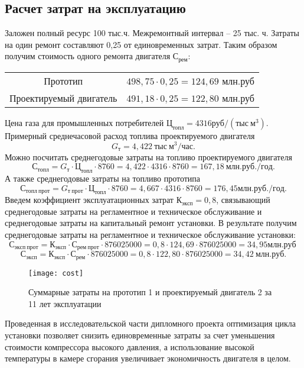 \subsection{Расчет затрат на эксплуатацию}
Заложен полный ресурс 100 тыс.ч. Межремонтный интервал – 25 тыс. ч. Затраты на один ремонт составляют 0,25 от единовременных затрат.
Таким образом получим стоимость одного ремонта двигателя $С_{рем}$:
\begin{longtable}{c c}
    Прототип & $498,75 \cdot 0,25=124,69$ млн.руб \\
    Проектируемый двигатель & $491,18 \cdot 0,25=122,80$ млн.руб \\
\end{longtable}
Цена газа для промышленных потребителей $Ц_{топл} = 4316 руб/(тыс \ м^3)$.
Примерный среднечасовой расход топлива проектируемого двигателя
$$
G_т = 4,422 \ тыс \ м^3 / час.
$$
Можно посчитать среднегодовые затраты на топливо проектируемого двигателя
$$
С_{топл}=G_т \cdot Ц_{топл} \cdot 8760 = 4,422 \cdot 4316 \cdot 8760 = 167,18 \ млн.руб./год.
$$
А также среднегодовые затраты на топливо прототипа
$$
С_{топл \ прот} = G_{т \ прот} \cdot Ц_{топл} \cdot 8760 = 4,667 \cdot 4316 \cdot 8760 = 176,45 млн.руб./год.
$$
Введем коэффициент эксплуатационных затрат $К_{эксп} = 0,8$, связывающий среднегодовые затраты на регламентное и
техническое обслуживание и среднегодовые затраты на капитальный ремонт установки. В результате получим среднегодовые
затраты на регламентное и техническое обслуживание установки:
$$
С_{эксп \ прот} = К_{эксп} \cdot С_{рем \ прот} \cdot 876025000 = 0,8 \cdot 124,69 \cdot 876025000 = 34,95 млн.руб \
$$
$$
С_{эксп} = К_{эксп} \cdot С_{рем} \cdot 876025000 = 0,8 \cdot 122,80 \cdot 876025000 = 34,42 \ млн.руб.
$$

\begin{figure}[H]
    \centering
    \texttt{[image: cost]}
    \caption{Суммарные затраты на прототип 1 и проектируемый двигатель 2 за 11 лет эксплуатации}
\end{figure}
Проведенная в исследовательской части дипломного проекта оптимизация цикла установки позволяет снизить единовременные
затраты за счет уменьшения стоимости компрессора высокого давления, а использование высокой температуры в камере сгорания
увеличивает экономичность двигателя в целом.